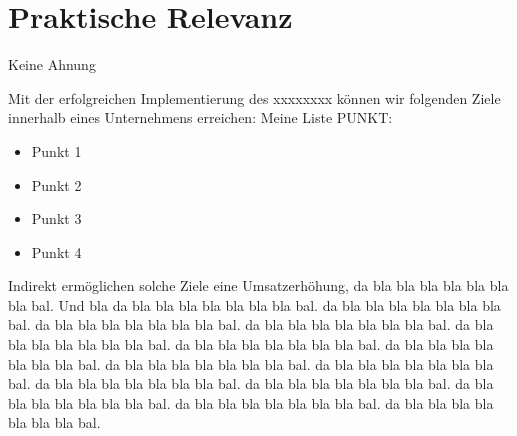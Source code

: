 \section{Praktische Relevanz}

Keine Ahnung






Mit der erfolgreichen Implementierung des xxxxxxxx können wir folgenden Ziele innerhalb eines Unternehmens erreichen:
Meine Liste PUNKT:
\begin{itemize}
    \item Punkt 1
    \item Punkt 2
    \item Punkt 3
    \item Punkt 4
\end{itemize}

Indirekt ermöglichen solche Ziele eine Umsatzerhöhung, da bla bla bla bla bla bla bla bal. 
Und bla da bla bla bla bla bla bla bla bal. da bla bla bla bla bla bla bla bal. da bla bla bla bla bla bla bla bal. 
da bla bla bla bla bla bla bla bal. da bla bla bla bla bla bla bla bal. da bla bla bla bla bla bla bla bal. 
da bla bla bla bla bla bla bla bal. da bla bla bla bla bla bla bla bal. da bla bla bla bla bla bla bla bal. 
da bla bla bla bla bla bla bla bal. da bla bla bla bla bla bla bla bal. da bla bla bla bla bla bla bla bal. 
da bla bla bla bla bla bla bla bal. da bla bla bla bla bla bla bla bal. 